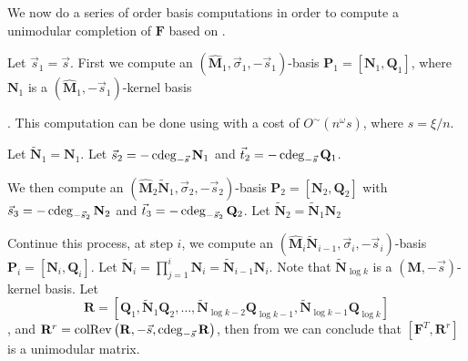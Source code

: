 We now do a series of order basis computations in order to compute
a unimodular completion of $\mathbf{F}$ based on .

Let $\vec{s}_{1}=\vec{s}$. First we compute an $\left(\hat{\mathbf{M}}_{1},\vec{\sigma}_{1},-\vec{s}_{1}\right)$-basis
$\mathbf{P}_{1}=\left[\mathbf{N}_{1},\mathbf{Q}_{1}\right]$, where
$\mathbf{N}_{1}$ is a $\left(\hat{\mathbf{M}}_{1},-\vec{s}_{1}\right)$-kernel
basis%
\begin{comment}
 with $\cdeg_{-\vec{s}_{1}}\mathbf{N}_{1}\le0$
\end{comment}
. This computation can be done using  with a
cost of $O^{\sim}\left(n^{\omega}s\right)$, where $s=\xi/n$. 

Let $\tilde{\mathbf{N}}_{1}=\mathbf{N}_{1}$. Let $\vec{s}_{2}=-\cdeg_{-\vec{s}}\mathbf{N}_{1}$
and $\vec{t}_{2}=-\cdeg_{-\vec{s}}\mathbf{Q}_{1}$. %
\begin{comment}
Note that $-\vec{s}_{1}\le-[\vec{s}_{2},\vec{t}_{2}]\le\left[0,\dots,0,1,\dots1\right]$
component-wise, since $\mathbf{P}_{1}$ has lower order than any $\left(\mathbf{M}^{T},\vec{b}+1,-\vec{s}\right)$-basis
$\mathbf{P}$ hence generates $\mathbf{P}$. Therefore, $\cdeg_{-\vec{s}}\mathbf{P}_{1}\le\cdeg_{-\vec{s}}\mathbf{P}\le\left[0,\dots,0,1,\dots1\right]$. 
\end{comment}
{} We then compute an $\left(\hat{\mathbf{M}}_{2}\tilde{\mathbf{N}}_{1},\vec{\sigma}_{2},-\vec{s}_{2}\right)$-basis
$\mathbf{P}_{2}=\left[\mathbf{N}_{2},\mathbf{Q}_{2}\right]$ with
$\vec{s}_{3}=-\cdeg_{-\vec{s}_{2}}\mathbf{N}_{2}$ and $\vec{t}_{3}=-\cdeg_{-\vec{s}_{2}}\mathbf{Q}_{2}$.
Let $\tilde{\mathbf{N}}_{2}=\tilde{\mathbf{N}}_{1}\mathbf{N}_{2}$
\begin{comment}
Let $\mathbf{R}_{1}=\left[\mathbf{N}_{1}\mathbf{Q}_{2},\mathbf{Q}_{1}\right]$
and $\mathbf{R}_{1}^{r}=\colRev\left(\mathbf{R}_{1},-\vec{s},\cdeg_{-\vec{s}}\mathbf{R}_{1}\right)$.
Then from \prettyref{lem:unimodularComputationByRows} we know $\left[\mathbf{F}^{T},\mathbf{R}_{1}^{r}\right]$
is a unimodular matrix.
\end{comment}


Continue this process, at step $i$, we compute an $\left(\hat{\mathbf{M}}_{i}\tilde{\mathbf{N}}_{i-1},\vec{\sigma}_{i},-\vec{s}_{i}\right)$-basis
$\mathbf{P}_{i}=\left[\mathbf{N}_{i},\mathbf{Q}_{i}\right]$. Let
$\tilde{\mathbf{N}}_{i}=\prod_{j=1}^{i}\mathbf{N}_{i}=\tilde{\mathbf{N}}_{i-1}\mathbf{N}_{i}$.
Note that $\tilde{\mathbf{N}}_{\log k}$ is a $\left(\mathbf{M},-\vec{s}\right)$-kernel
basis. Let 
\[
\mathbf{R}=\left[\mathbf{Q}_{1},\tilde{\mathbf{N}}_{1}\mathbf{Q}_{2},\dots,\tilde{\mathbf{N}}_{\log k-2}\mathbf{Q}_{\log k-1},\tilde{\mathbf{N}}_{\log k-1}\mathbf{Q}_{\log k}\right]
\]
, and $\mathbf{R}^{r}=\colRev\left(\mathbf{R},-\vec{s},\cdeg_{-\vec{s}}\mathbf{R}\right)$,
then from  we can conclude
that $\left[\mathbf{F}^{T},\mathbf{R}^{r}\right]$ is a unimodular
matrix. 

